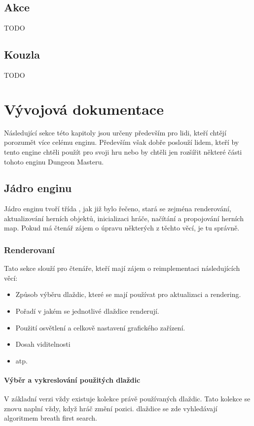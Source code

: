 \section{Akce}
TODO

\section{Kouzla}
TODO

\chapter{Vývojová dokumentace}
Následující sekce této kapitoly jsou určeny především pro lidi, kteří chtějí porozumět více celému enginu. Především
však dobře poslouží lidem, kteří by tento engine chtěli použít pro svoji hru nebo by chtěli jen rozšířit některé části
tohoto enginu Dungeon Masteru.

\section{Jádro enginu}
Jádro enginu tvoří třída , jak již bylo řečeno, stará se zejména renderování, aktualizování herních objektů,
inicializaci hráče, načítání a propojování herních map. Pokud má čtenář zájem o úpravu některých z těchto věcí, je tu správně.

\subsection{Renderovaní}
Tato sekce slouží pro čtenáře, kteří mají zájem o reimplementaci následujících věcí:

\begin{itemize}
\item Způsob výběru dlaždic, které se mají používat pro aktualizaci a rendering.
\item Pořadí v jakém se jednotlivé dlaždice renderují.
\item Použití osvětlení a celkově nastavení grafického zařízení.
\item Dosah viditelnosti
\item atp.
\end{itemize}

\subsubsection{Výběr a vykreslování použitých dlaždic}
V základní verzi vždy existuje kolekce právě používaných dlaždic. Tato kolekce se znovu naplní vždy, když hráč změní
pozici. dlaždice se zde vyhledávají algoritmem breath first search.

